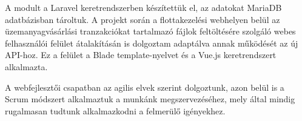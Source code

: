 A modult a Laravel keretrendszerben készítettük el, az adatokat MariaDB adatbázisban tároltuk. A projekt során a flottakezelési webhelyen belül az üzemanyagvásárlási tranzakciókat tartalmazó fájlok feltöltésére szolgáló webes felhasználói felület átalakításán is dolgoztam adaptálva annak működését az új API-hoz. Ez a felület a Blade template-nyelvet és a Vue.js keretrendszert alkalmazta.

A webfejlesztői csapatban az agilis elvek szerint dolgoztunk, azon belül is a Scrum módszert alkalmaztuk a munkánk megszervezéséhez, mely által mindig rugalmasan tudtunk alkalmazkodni a felmerülő igényekhez.